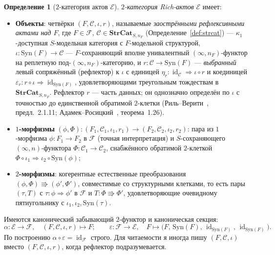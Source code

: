 \documentclass[11pt]{article}
\theoremstyle{plain}
\theoremstyle{definition}
\newtheorem{definition}[theorem]{Определение}
\newcommand{\cF}{\mathcal{F}}
\newcommand{\cC}{\mathcal{C}}
\newcommand{\Syn}{\mathrm{Syn}}
\newcommand{\cE}{\mathcal{E}}
\DeclareMathOperator{\id}{id}
\begin{document}
\begin{definition}[$2$-категория актов $\cE$]\label{def:enactments}
\emph{$2$-категория Rich-актов} $\cE$ имеет:
\begin{itemize}
\item \textbf{Объекты}: четвёрки $(F, \cC, \iota, r)$, называемые \emph{заострёнными рефлексивными актами над $F$}, где $F \in \cF$, $\cC \in \mathbf{StrCat}_{S, n_F}$ (Определение~\ref{def:strcat}) — $\kappa_1$-доступная $S$-модельная категория с $F$-модельной структурой, $\iota : \Syn(F) \to \cC$ — $F$-сохраняющий вполне унивалентный $(\infty, n_F)$-функтор на реплетную под-$(\infty, n_F)$-категорию, и $r : \cC \to \Syn(F)$ — \emph{выбранный} левый сопряжённый (рефлектор) к $\iota$ с единицей $\eta_r : \id_\cC \Rightarrow \iota \circ r$ и коединицей $\varepsilon_r : r \circ \iota \Rightarrow \id_{\Syn(F)}$, удовлетворяющими треугольным тождествам в $\mathbf{StrCat}_{S, n_F}$. Рефлектор $r$ — часть данных; он однозначно определён по $\iota$ с точностью до единственной обратимой $2$-клетки (Риль--Верити~\cite{RiehlVerity2022}, предл.~2.1.11; Адамек--Росицкий~\cite{AdamekRosicky1994}, теорема~1.26).
\item \textbf{$1$-морфизмы} $(\phi, \Phi) : (F_1, \cC_1, \iota_1, r_1) \to (F_2, \cC_2, \iota_2, r_2)$: пара из $1$-морфизма $\phi : F_1 \to F_2$ в $\cF$ (точная интерпретация) и $S$-сохраняющего $(\infty, n)$-функтора $\Phi : \cC_1 \to \cC_2$, снабжённого обратимой $2$-клеткой $\Phi \circ \iota_1 \Rightarrow \iota_2 \circ \Syn(\phi)$;
\item \textbf{$2$-морфизмы}: когерентные естественные преобразования $(\phi, \Phi) \Rrightarrow (\phi', \Phi')$, совместимые со структурными клетками, то есть пары $(\tau, T)$ с $\tau : \phi \Rightarrow \phi'$ в $\cF$ и $T : \Phi \Rrightarrow \Phi'$, удовлетворяющие очевидному пятиугольнику с $\iota_1, \iota_2, \Syn(\tau)$.
\end{itemize}
Имеются канонический забывающий $2$-функтор и каноническая секция:
\[
  \alpha : \cE \to \cF, \quad (F, \cC, \iota, r) \mapsto F; \qquad
  \varepsilon : \cF \to \cE, \quad F \mapsto \bigl(F,\, \Syn(F),\, \id_{\Syn(F)},\, \id_{\Syn(F)}\bigr).
\]
По построению $\alpha \circ \varepsilon = \id_\cF$ строго. Для читаемости я иногда пишу $(F, \cC, \iota)$ вместо $(F, \cC, \iota, r)$, когда рефлектор подразумевается.
\end{definition}
\end{document}
